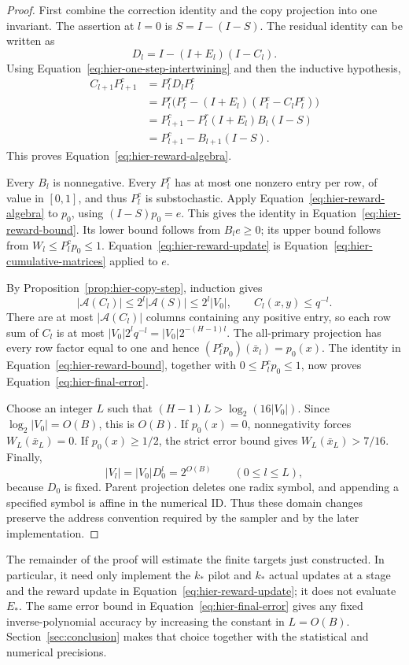 \begin{proof}
First combine the correction identity and the copy projection into one invariant. The assertion at $l=0$ is $S=I-(I-S)$.  The residual identity can be
written as
\[
 D_l=I-(I+E_l)(I-C_l).
\]
Using Equation~\eqref{eq:hier-one-step-intertwining} and then the
inductive hypothesis,
\begin{align*}
 C_{l+1}P_{l+1}^c
 &=P_l^rD_lP_l^c\\
 &=P_l^r\bigl(P_l^c-(I+E_l)(P_l^c-C_lP_l^c)\bigr)\\
 &=P_{l+1}^c-P_l^r(I+E_l)B_l(I-S)\\
 &=P_{l+1}^c-B_{l+1}(I-S).
\end{align*}
This proves Equation~\eqref{eq:hier-reward-algebra}.

Every $B_l$ is nonnegative.  Every $P_l^r$ has at most one nonzero
entry per row, of value in $[0,1]$, and thus $P_l^c$ is
substochastic.  Apply Equation~\eqref{eq:hier-reward-algebra} to
$p_0$, using $(I-S)p_0=e$.  This gives the identity in
Equation~\eqref{eq:hier-reward-bound}.  Its lower bound follows from
$B_le\geq0$; its upper bound follows from
$W_l\leq P_l^cp_0\leq1$.  Equation~\eqref{eq:hier-reward-update}
is Equation~\eqref{eq:hier-cumulative-matrices} applied to $e$.

By Proposition~\ref{prop:hier-copy-step}, induction gives
\[
 |\mathcal A(C_l)|\leq2^l|\mathcal A(S)|\leq2^l|V_0|,
 \qquad C_l(x,y)\leq q^{-l}.
\]
There are at most $|\mathcal A(C_l)|$ columns containing any positive
entry, so each row sum of $C_l$ is at most
$|V_0|2^lq^{-l}=|V_0|2^{-(H-1)l}$.
The all-primary projection has every row factor equal to one and hence
$(P_l^cp_0)(\bar x_l)=p_0(x)$.  The identity in
Equation~\eqref{eq:hier-reward-bound}, together with
$0\leq P_l^cp_0\leq1$, now proves
Equation~\eqref{eq:hier-final-error}.

Choose an integer $L$ such that
$(H-1)L>\log_2(16|V_0|)$.  Since $\log_2|V_0|=O(B)$, this is
$O(B)$.  If $p_0(x)=0$, nonnegativity forces
$W_L(\bar x_L)=0$.  If $p_0(x)\geq1/2$, the strict error bound
gives $W_L(\bar x_L)>7/16$.  Finally,
\[
 |V_l|=|V_0|D_0^l=2^{O(B)}\qquad(0\leq l\leq L),
\]
because $D_0$ is fixed.  Parent projection deletes one radix symbol,
and appending a specified symbol is affine in the numerical ID.  Thus
these domain changes preserve the address convention required by the
sampler and by the later implementation.
\end{proof}

The remainder of the proof will estimate the finite targets just
constructed.  In particular, it need only implement the $k_*$ pilot and
$k_*$ actual updates at a stage and the reward update in
Equation~\eqref{eq:hier-reward-update}; it does not evaluate $E_*$.
The same error bound in Equation~\eqref{eq:hier-final-error} gives any
fixed inverse-polynomial accuracy by increasing the constant in
$L=O(B)$.  Section~\ref{sec:conclusion} makes that choice together with
the statistical and numerical precisions.

